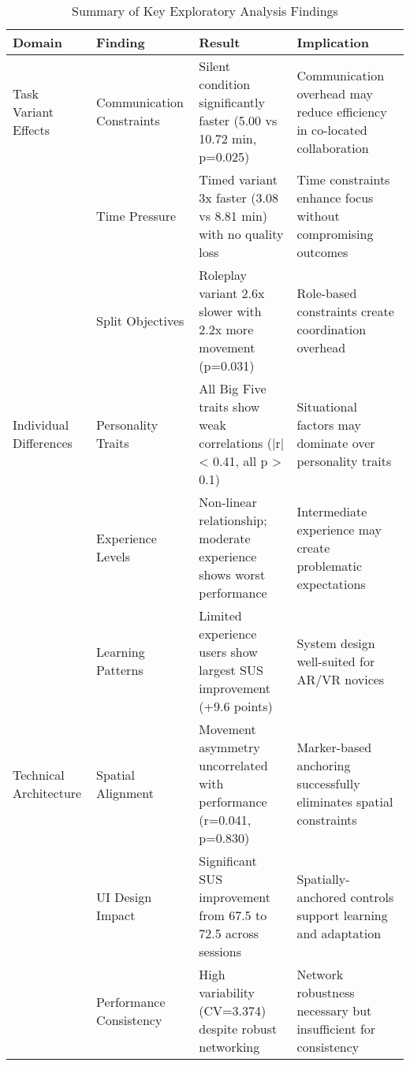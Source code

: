 
\begin{table}[htbp]
\centering
\caption{Summary of Key Exploratory Analysis Findings}
\label{tab:exploratory_analysis_summary}
\begin{tabular}{@{}p{2.5cm}p{2.8cm}p{4.2cm}p{4.5cm}@{}}
\toprule
\textbf{Domain} & \textbf{Finding} & \textbf{Result} & \textbf{Implication} \\
\midrule
Task Variant Effects & Communication Constraints & Silent condition significantly faster (5.00 vs 10.72 min, p=0.025) & Communication overhead may reduce efficiency in co-located collaboration \\
 & Time Pressure & Timed variant 3x faster (3.08 vs 8.81 min) with no quality loss & Time constraints enhance focus without compromising outcomes \\
 & Split Objectives & Roleplay variant 2.6x slower with 2.2x more movement (p=0.031) & Role-based constraints create coordination overhead \\
Individual Differences & Personality Traits & All Big Five traits show weak correlations (|r| < 0.41, all p > 0.1) & Situational factors may dominate over personality traits \\
 & Experience Levels & Non-linear relationship; moderate experience shows worst performance & Intermediate experience may create problematic expectations \\
 & Learning Patterns & Limited experience users show largest SUS improvement (+9.6 points) & System design well-suited for AR/VR novices \\
Technical Architecture & Spatial Alignment & Movement asymmetry uncorrelated with performance (r=0.041, p=0.830) & Marker-based anchoring successfully eliminates spatial constraints \\
 & UI Design Impact & Significant SUS improvement from 67.5 to 72.5 across sessions & Spatially-anchored controls support learning and adaptation \\
 & Performance Consistency & High variability (CV=3.374) despite robust networking & Network robustness necessary but insufficient for consistency \\
\bottomrule
\end{tabular}
\end{table}
